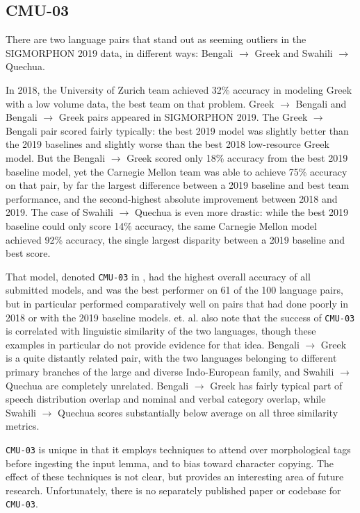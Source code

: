 \subsection{CMU-03}

There are two language pairs that stand out as seeming outliers in the SIGMORPHON 2019 data, in different ways: Bengali $\rightarrow$ Greek and Swahili $\rightarrow$ Quechua. 

In 2018, the University of Zurich team achieved 32\% accuracy in modeling Greek with a low volume data, the best team on that problem. Greek $\rightarrow$ Bengali and Bengali $\rightarrow$ Greek pairs appeared in SIGMORPHON 2019. The Greek $\rightarrow$ Bengali pair scored fairly typically: the best 2019 model was slightly better than the 2019 baselines and slightly worse than the best 2018 low-resource Greek model. But the Bengali $\rightarrow$ Greek scored only 18\% accuracy from the best 2019 baseline model, yet the Carnegie Mellon team was able to achieve 75\% accuracy on that pair, by far the largest difference between a 2019 baseline and best team performance, and the second-highest absolute improvement between 2018 and 2019. The case of Swahili $\rightarrow$ Quechua is even more drastic: while the best 2019 baseline could only score 14\% accuracy, the same Carnegie Mellon model achieved 92\% accuracy, the single largest disparity between a 2019 baseline and best score.

That model, denoted \texttt{CMU-03} in \cite{McCarthy2019}, had the highest overall accuracy of all submitted models, and was the best performer on 61 of the 100 language pairs, but in particular performed comparatively well on pairs that had done poorly in 2018 or with the 2019 baseline models. \cite{McCarthy2019} et. al. also note that the success of \texttt{CMU-03} is correlated with linguistic similarity of the two languages, though these examples in particular do not provide evidence for that idea. Bengali $\rightarrow$ Greek is a quite distantly related pair, with the two languages belonging to different primary branches of the large and diverse Indo-European family, and Swahili $\rightarrow$ Quechua are completely unrelated. Bengali $\rightarrow$ Greek has fairly typical part of speech distribution overlap and nominal and verbal category overlap, while Swahili $\rightarrow$ Quechua scores substantially below average on all three similarity metrics.

\texttt{CMU-03} is unique in that it employs techniques to attend over morphological tags before ingesting the input lemma, and to bias toward character copying. The effect of these techniques is not clear, but provides an interesting area of future research. Unfortunately, there is no separately published paper or codebase for \texttt{CMU-03}.

